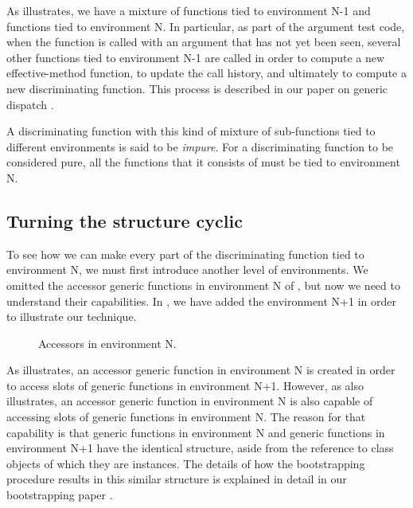 As  illustrates, we have a
mixture of functions tied to environment N-1 and functions tied to
environment N.  In particular, as part of the argument test code, when
the function is called with an argument that has not yet been seen,
several other functions tied to environment N-1 are called in order to
compute a new effective-method function, to update the call history,
and ultimately to compute a new discriminating function.  This process
is described in our paper on generic dispatch
\cite{Strandh:2014:FGD:2635648.2635654}.

A discriminating function with this kind of mixture of sub-functions
tied to different environments is said to be \emph{impure}.  For a
discriminating function to be considered pure, all the functions that
it consists of must be tied to environment N.

\subsection{Turning the structure cyclic}

To see how we can make every part of the discriminating function tied
to environment N, we must first introduce another level of
environments.  We omitted the accessor generic functions in
environment N of , but now we need to
understand their capabilities.  In , we
have added the environment N+1 in order to illustrate our technique.

\begin{figure}
\begin{center}
\end{center}
\caption{\label{fig-constellation-2}
Accessors in environment N.}
\end{figure}

As  illustrates, an accessor generic
function in environment N is created in order to access slots of
generic functions in environment N+1.  However, as
 also illustrates, an accessor generic
function in environment N is also capable of accessing slots of
generic functions in environment N.  The reason for that capability is
that generic functions in environment N and generic functions in
environment N+1 have the identical structure, aside from the reference
to class objects of which they are instances.  The details of how the
bootstrapping procedure results in this similar structure is explained
in detail in our bootstrapping paper
\cite{Durand-Strandh:2019:ELS:Bootstrapping}.

